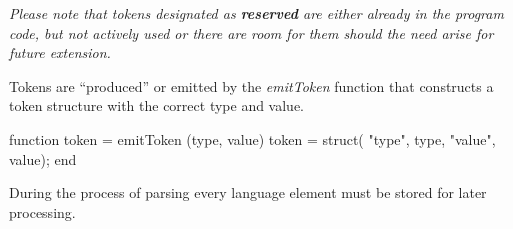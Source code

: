 \textit{Please note that tokens designated as \textbf{reserved} are either already in the program code, but not actively used or there are room for them should the need arise for future extension.}

Tokens are ``produced'' or emitted by the \textit{emitToken}  function that constructs a token structure with the correct type and value.

\begin{octave}
function token = emitToken (type, value)
  token = struct(
  "type", type,
  "value", value);
end
\end{octave}

During the process of parsing every language element must be stored for later processing.
